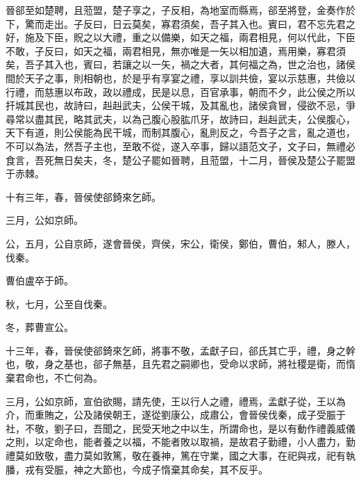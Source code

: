 \begin{pinyinscope}
晉郤至如楚聘，且蒞盟，楚子享之，子反相，為地室而縣焉，郤至將登，金奏作於下，驚而走出。子反曰，日云莫矣，寡君須矣，吾子其入也。賓曰，君不忘先君之好，施及下臣，貺之以大禮，重之以備樂，如天之福，兩君相見，何以代此，下臣不敢，子反曰，如天之福，兩君相見，無亦唯是一矢以相加遺，焉用樂，寡君須矣，吾子其入也，賓曰，若讓之以一矢，禍之大者，其何福之為，世之治也，諸侯間於天子之事，則相朝也，於是乎有享宴之禮，享以訓共儉，宴以示慈惠，共儉以行禮，而慈惠以布政，政以禮成，民是以息，百官承事，朝而不夕，此公侯之所以扞城其民也，故詩曰，赳赳武夫，公侯干城，及其亂也，諸侯貪冒，侵欲不忌，爭尋常以盡其民，略其武夫，以為己腹心股肱爪牙，故詩曰，赳赳武夫，公侯腹心，天下有道，則公侯能為民干城，而制其腹心，亂則反之，今吾子之言，亂之道也，不可以為法，然吾子主也，至敢不從，遂入卒事，歸以語范文子，文子曰，無禮必食言，吾死無日矣夫，冬，楚公子罷如晉聘，且蒞盟，十二月，晉侯及楚公子罷盟于赤棘。

十有三年，春，晉侯使郤錡來乞師。

三月，公如京師。

公，五月，公自京師，遂會晉侯，齊侯，宋公，衛侯，鄭伯，曹伯，邾人，滕人，伐秦。

曹伯盧卒于師。

秋，七月，公至自伐秦。

冬，葬曹宣公。

十三年，春，晉侯使郤錡來乞師，將事不敬，孟獻子曰，郤氏其亡乎，禮，身之幹也，敬，身之基也，郤子無基，且先君之嗣卿也，受命以求師，將社稷是衛，而惰棄君命也，不亡何為。

三月，公如京師，宣伯欲賜，請先使，王以行人之禮，禮焉，孟獻子從，王以為介，而重賄之，公及諸侯朝王，遂從劉康公，成肅公，會晉侯伐秦，成子受脤于社，不敬，劉子曰，吾聞之，民受天地之中以生，所謂命也，是以有動作禮義威儀之則，以定命也，能者養之以福，不能者敗以取禍，是故君子勤禮，小人盡力，勤禮莫如致敬，盡力莫如敦篤，敬在養神，篤在守業，國之大事，在祀與戎，祀有執膰，戎有受脤，神之大節也，今成子惰棄其命矣，其不反乎。


\end{pinyinscope}
